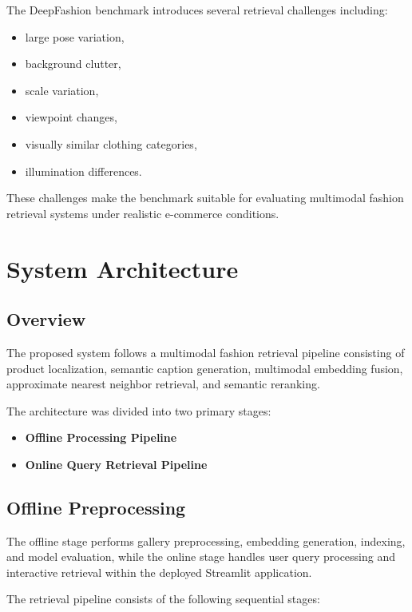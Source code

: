 \documentclass[11pt,a4paper]{article}
\begin{document}
The DeepFashion benchmark introduces several retrieval challenges including:

\begin{itemize}
    \item large pose variation,
    \item background clutter,
    \item scale variation,
    \item viewpoint changes,
    \item visually similar clothing categories,
    \item illumination differences.
\end{itemize}

These challenges make the benchmark suitable for evaluating multimodal fashion retrieval systems under realistic e-commerce conditions.

\section{System Architecture}

\subsection{Overview}

The proposed system follows a multimodal fashion retrieval pipeline consisting of product localization, semantic caption generation, multimodal embedding fusion, approximate nearest neighbor retrieval, and semantic reranking.

The architecture was divided into two primary stages:

\begin{itemize}
    \item \textbf{Offline Processing Pipeline}
    \item \textbf{Online Query Retrieval Pipeline}
\end{itemize}

\subsection{Offline Preprocessing}The offline stage performs gallery preprocessing, embedding generation, indexing, and model evaluation, while the online stage handles user query processing and interactive retrieval within the deployed Streamlit application.

The retrieval pipeline consists of the following sequential stages:
\end{document}
